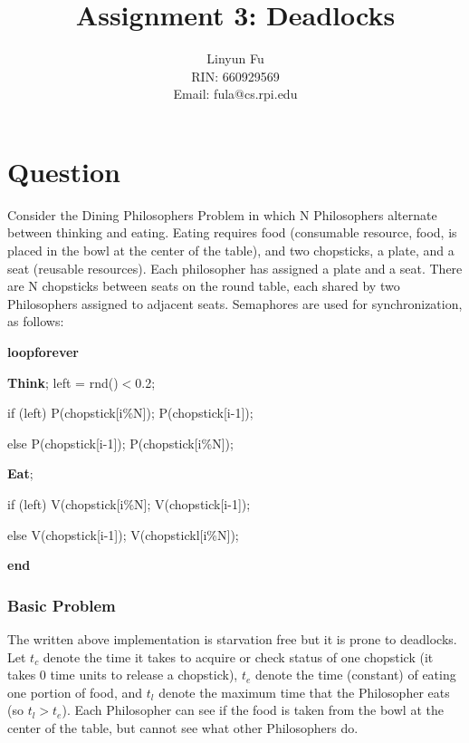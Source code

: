 \documentclass[12pt,letterpaper]{article}
\author{Linyun Fu\\RIN: 660929569\\Email: fula@cs.rpi.edu}
\title{Assignment 3: Deadlocks}
\begin{document}
\maketitle
\part*{Question}
Consider the Dining Philosophers Problem in which N Philosophers
alternate between thinking and eating. Eating requires food
(consumable resource, food, is placed in the bowl at the center of
the table), and two chopsticks, a plate, and a seat (reusable
resources). Each philosopher has assigned a plate and a seat.
There are N chopsticks between seats on the round table, each
shared by two Philosophers assigned to adjacent seats.
Semaphores are used for synchronization, as follows:

\textbf{loopforever}

\hspace{3em}\textbf{Think}; left = rnd()$<$0.2;

\hspace{3em}if (left) P(chopstick[i\%N]); P(chopstick[i-1]);

\hspace{3em}else P(chopstick[i-1]); P(chopstick[i\%N]);

\hspace{3em}\textbf{Eat};

\hspace{3em}if (left) V(chopstick[i\%N]; V(chopstick[i-1]);

\hspace{3em}else V(chopstick[i-1]); V(chopstickl[i\%N]);

\textbf{end}

\section*{Basic Problem}
The written above implementation is starvation free but it is prone to deadlocks. Let $t_c$
denote the time it takes to acquire or check status of one chopstick (it takes 0 time
units to release a chopstick), $t_e$ denote the time (constant) of eating one portion of
food, and $t_l$ denote the maximum time that the Philosopher eats (so $t_l>t_e$). Each
Philosopher can see if the food is taken from the bowl at the center of the table,
but cannot see what other Philosophers do.
\end{document}
